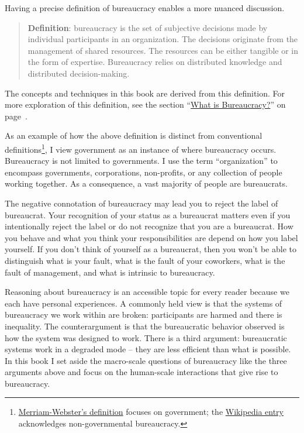Having a precise definition of bureaucracy enables a more nuanced discussion. 
\begin{quote}
\textbf{Definition}: \Gls{bureaucracy} is the set of subjective decisions made by individual participants in an organization. The decisions originate from the management of shared resources. The resources can be either tangible or in the form of expertise. Bureaucracy relies on distributed knowledge and distributed decision-making. 
\end{quote}

The concepts and techniques in this book are derived from this definition. For more exploration of this definition, see the section ``\hyperref[sec:define-bureaucracy]{What is Bureaucracy?}'' on page~\pageref{sec:define-bureaucracy}.

As an example of how the above definition is distinct from conventional definitions\footnote{\href{https://www.merriam-webster.com/dictionary/bureaucracy}{Merriam-Webster's definition} focuses on government; the \href{https://en.wikipedia.org/wiki/Bureaucracy}{Wikipedia entry}
acknowledges non-governmental bureaucracy.}, I view government as an instance of where bureaucracy occurs. Bureaucracy is not limited to governments. I use the term ``organization'' to encompass governments, corporations, non-profits, or any collection of people working together. As a consequence, a vast majority of people are bureaucrats. 

The negative connotation of bureaucracy may lead you to reject the label of bureaucrat. Your recognition of your status as a bureaucrat matters even if you intentionally reject the label or do not recognize that you are a bureaucrat. How you behave and what you think your responsibilities are depend on how you label yourself.
If you don't think of yourself as a bureaucrat, then you won't be able to distinguish what is your fault, what is the fault of your coworkers, what is the fault of management, and what is intrinsic to bureaucracy. 

Reasoning about bureaucracy is an accessible topic for every reader because we each have personal experiences.
A commonly held view is that the systems of bureaucracy we work within are broken: participants are harmed and there is inequality. 
The counterargument is that the bureaucratic behavior observed is how the system was designed to work. There is a third argument: bureaucratic systems work in a degraded mode -- they are less efficient than what is possible. 
In this book I set aside the macro-scale questions of bureaucracy like the three arguments above and focus on the human-scale interactions that give rise to bureaucracy.

